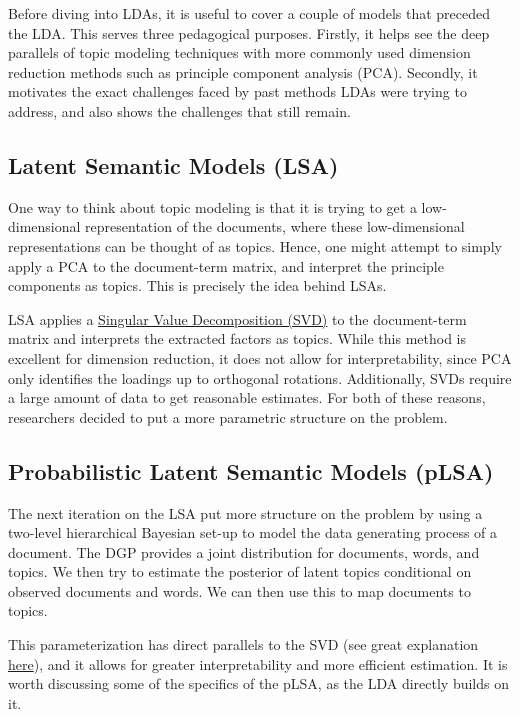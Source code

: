 \documentclass[
]{book}
\begin{document}
Before diving into LDAs, it is useful to cover a couple of models that preceded the LDA. This serves three pedagogical purposes. Firstly, it helps see the deep parallels of topic modeling techniques with more commonly used dimension reduction methods such as principle component analysis (PCA). Secondly, it motivates the exact challenges faced by past methods LDAs were trying to address, and also shows the challenges that still remain.

\hypertarget{latent-semantic-models-lsa}{%
\subsection{Latent Semantic Models (LSA)}\label{latent-semantic-models-lsa}}

One way to think about topic modeling is that it is trying to get a low-dimensional representation of the documents, where these low-dimensional representations can be thought of as topics. Hence, one might attempt to simply apply a PCA to the document-term matrix, and interpret the principle components as topics. This is precisely the idea behind LSAs.

LSA applies a \href{https://en.wikipedia.org/wiki/Singular_value_decomposition}{Singular Value Decomposition (SVD)} to the document-term matrix and interprets the extracted factors as topics. While this method is excellent for dimension reduction, it does not allow for interpretability, since PCA only identifies the loadings up to orthogonal rotations. Additionally, SVDs require a large amount of data to get reasonable estimates. For both of these reasons, researchers decided to put a more parametric structure on the problem.

\hypertarget{probabilistic-latent-semantic-models-plsa}{%
\subsection{Probabilistic Latent Semantic Models (pLSA)}\label{probabilistic-latent-semantic-models-plsa}}

The next iteration on the LSA put more structure on the problem by using a two-level hierarchical Bayesian set-up to model the data generating process of a document. The DGP provides a joint distribution for documents, words, and topics. We then try to estimate the posterior of latent topics conditional on observed documents and words. We can then use this to map documents to topics.

This parameterization has direct parallels to the SVD (see great explanation \href{https://medium.com/nanonets/topic-modeling-with-lsa-psla-lda-and-lda2vec-555ff65b0b05}{here}), and it allows for greater interpretability and more efficient estimation. It is worth discussing some of the specifics of the pLSA, as the LDA directly builds on it.
\end{document}
